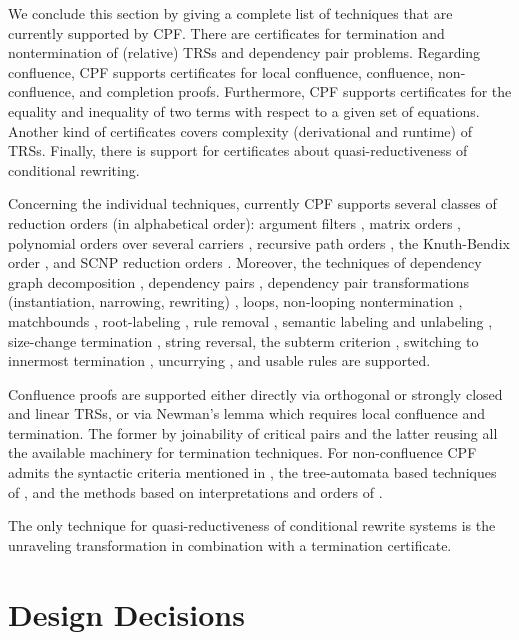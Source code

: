 \documentclass[USenglish]{eptcs}
\begin{document}
We conclude this section by giving a complete list of techniques that are
currently supported by CPF. There are certificates for termination and nontermination of
(relative) TRSs and dependency pair problems.  Regarding confluence, CPF
supports certificates for local confluence, confluence, non-confluence, and
completion proofs. Furthermore, CPF supports certificates for the equality and
inequality of two terms with respect to a given set of equations. Another kind
of certificates covers complexity (derivational and runtime) of TRSs. Finally,
there is support for certificates about quasi-reductiveness
of conditional rewriting.

Concerning the individual techniques, 
currently CPF supports several classes of reduction orders
(in alphabetical order): 
argument filters \cite{AG00},
matrix orders \cite{EWZ08},
polynomial orders over several carriers \cite{L79,arctic,rational},
recursive path orders \cite{D87},
the Knuth-Bendix order \cite{KB70}, and 
SCNP reduction orders \cite{CFGSK10}.
Moreover, the techniques of 
dependency graph decomposition \cite{AG00}, 
dependency pairs \cite{AG00,dp-framework}, 
dependency pair transformations (instantiation, narrowing, rewriting) \cite{AG00,dp-framework},
loops,
non-looping nontermination \cite{EEG12},
matchbounds \cite{matchbounds},
root-labeling \cite{root-labeling}, 
rule removal \cite{L79,HM07},
semantic labeling and unlabeling \cite{Z95}, 
size-change termination \cite{LJBA01,AAECC05}, 
string reversal, 
the subterm criterion \cite{HM07}, 
switching to innermost termination \cite{G95},
uncurrying \cite{UncurryHMZ,UncurryST}, 
and usable rules \cite{AG00,U01,dp-framework}
are supported.

Confluence proofs are supported either directly via orthogonal or strongly closed
and linear TRSs, or via Newman's
lemma which requires local confluence and termination. The former by joinability
of critical pairs and the latter reusing all the available machinery for
termination techniques. For non-confluence CPF admits the syntactic criteria mentioned
in \cite{csi}, the tree-automata based techniques of \cite{FT14}, and the methods
based on interpretations and orders of \cite{Aoto13}.

The only technique for quasi-reductiveness of conditional rewrite systems 
is the unraveling transformation in
combination with a termination certificate.


\section{Design Decisions}
\end{document}
